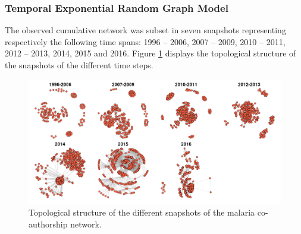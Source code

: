 \subsubsection{Temporal Exponential Random Graph Model}
\label{sec:malaria_results_tergm}
The observed cumulative network was subset in seven snapshots representing respectively the following time spans: 1996 -- 2006, 2007 -- 2009, 2010 -- 2011, 2012 -- 2013, 2014, 2015 and 2016. %
Figure \ref{fig:malaria_dynNetwork} displays the topological structure of the snapshots of the different time steps.

\begin{figure}[!ht]
\hspace{-1.25cm}
\includegraphics[scale=0.4]{Chapters/malaria/statMod/dynMNet2}
\caption{Topological structure of the different snapshots of the malaria co-authorship network.}
\label{fig:malaria_dynNetwork}
\end{figure}

